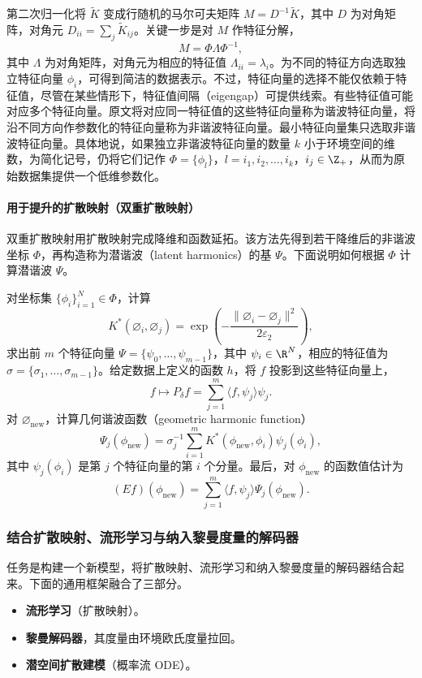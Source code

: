 第二次归一化将 $\tilde K$ 变成行随机的马尔可夫矩阵 $M=D^{-1}\tilde K$，其中 $D$ 为对角矩阵，对角元 $D_{ii}=\sum_j\tilde K_{ij}$。关键一步是对 $M$ 作特征分解，
\[
  M=\Phi\Lambda\Phi^{-1},
\]
其中 $\Lambda$ 为对角矩阵，对角元为相应的特征值 $\Lambda_{ii}=\lambda_i$。为不同的特征方向选取独立特征向量 $\phi_i$，可得到简洁的数据表示。不过，特征向量的选择不能仅依赖于特征值，尽管在某些情形下，特征值间隔（eigengap）可提供线索。有些特征值可能对应多个特征向量。原文将对应同一特征值的这些特征向量称为谐波特征向量，将沿不同方向作参数化的特征向量称为非谐波特征向量。最小特征向量集只选取非谐波特征向量。具体地说，如果独立非谐波特征向量的数量 $k$ 小于环境空间的维数，为简化记号，仍将它们记作 $\Phi=\{\phi_l\}$，$l=i_1,i_2,\ldots,i_k$，$i_j\in\Z_+$，从而为原始数据集提供一个低维参数化。

\paragraph{用于提升的扩散映射（双重扩散映射）}

双重扩散映射用扩散映射完成降维和函数延拓。该方法先得到若干降维后的非谐波坐标 $\Phi$，再构造称为潜谐波（latent harmonics）的基 $\Psi$。下面说明如何根据 $\Phi$ 计算潜谐波 $\Psi$。

对坐标集 $\{\phi_i\}_{i=1}^N\in\Phi$，计算
\[
  K^*(\varnothing_i,\varnothing_j)
    =\exp\left(-\frac{\lVert\varnothing_i-\varnothing_j\rVert^2}{2\varepsilon_2}\right),
\]
求出前 $m$ 个特征向量 $\Psi=\{\psi_0,\ldots,\psi_{m-1}\}$，其中 $\psi_i\in\R^N$，相应的特征值为 $\sigma=\{\sigma_1,\ldots,\sigma_{m-1}\}$。给定数据上定义的函数 $h$，将 $f$ 投影到这些特征向量上，
\[
  f\longmapsto P_\delta f=\sum_{j=1}^m\langle f,\psi_j\rangle\psi_j.
\]
对 $\varnothing_{\mathrm{new}}$，计算几何谐波函数（geometric harmonic function）
\[
  \Psi_j(\phi_{\mathrm{new}})
   =\sigma_j^{-1}\sum_{i=1}^{m}K^*(\phi_{\mathrm{new}},\phi_i)\psi_j(\phi_i),
\]
其中 $\psi_j(\phi_i)$ 是第 $j$ 个特征向量的第 $i$ 个分量。最后，对 $\phi_{\mathrm{new}}$ 的函数值估计为
\[
  (Ef)(\phi_{\mathrm{new}})
     =\sum_{j=1}^m\langle f,\psi_j\rangle\Psi_j(\phi_{\mathrm{new}}).
\]

\subsubsection{结合扩散映射、流形学习与纳入黎曼度量的解码器}

任务是构建一个新模型，将扩散映射、流形学习和纳入黎曼度量的解码器结合起来。下面的通用框架融合了三部分。
\begin{itemize}
  \item \textbf{流形学习}（扩散映射）。
  \item \textbf{黎曼解码器}，其度量由环境欧氏度量拉回。
  \item \textbf{潜空间扩散建模}（概率流 ODE）。
\end{itemize}

